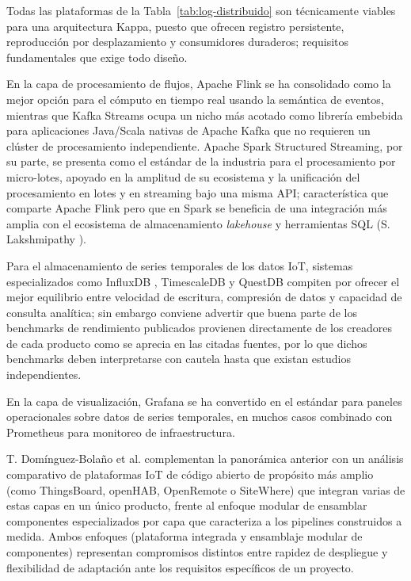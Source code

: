 Todas las plataformas de la Tabla~\ref{tab:log-distribuido} son técnicamente viables para una arquitectura Kappa, puesto que ofrecen registro persistente, reproducción por desplazamiento y consumidores duraderos; requisitos fundamentales que exige todo diseño.

En la capa de procesamiento de flujos, Apache Flink se ha consolidado como la mejor opción para el cómputo en tiempo real usando la semántica de eventos, mientras que Kafka Streams ocupa un nicho más acotado como librería embebida para aplicaciones Java/Scala nativas de Apache Kafka que no requieren un clúster de procesamiento independiente. Apache Spark Structured Streaming, por su parte, se presenta como el estándar de la industria para el procesamiento por micro-lotes, apoyado en la amplitud de su ecosistema y la unificación del procesamiento en lotes y en streaming bajo una misma API; característica que comparte Apache Flink pero que en Spark se beneficia de una integración más amplia con el ecosistema de almacenamiento \textit{lakehouse} y herramientas SQL (S. Lakshmipathy \cite{lakshmipathy2025}).

Para el almacenamiento de series temporales de los datos IoT, sistemas especializados como InfluxDB \cite{influxdata2025}, TimescaleDB \cite{tigerdata2026} y QuestDB \cite{questdb2025} compiten por ofrecer el mejor equilibrio entre velocidad de escritura, compresión de datos y capacidad de consulta analítica; sin embargo conviene advertir que buena parte de los benchmarks de rendimiento publicados provienen directamente de los creadores de cada producto como se aprecia en las citadas fuentes, por lo que dichos benchmarks deben interpretarse con cautela hasta que existan estudios independientes.

En la capa de visualización, Grafana se ha convertido en el estándar para paneles operacionales sobre datos de series temporales, en muchos casos combinado con Prometheus para monitoreo de infraestructura.

T. Domínguez-Bolaño et al. \cite{dominguez2022} complementan la panorámica anterior con un análisis comparativo de plataformas IoT de código abierto de propósito más amplio (como ThingsBoard, openHAB, OpenRemote o SiteWhere) que integran varias de estas capas en un único producto, frente al enfoque modular de ensamblar componentes especializados por capa que caracteriza a los pipelines construidos a medida. Ambos enfoques (plataforma integrada y ensamblaje modular de componentes) representan compromisos distintos entre rapidez de despliegue y flexibilidad de adaptación ante los requisitos específicos de un proyecto.

